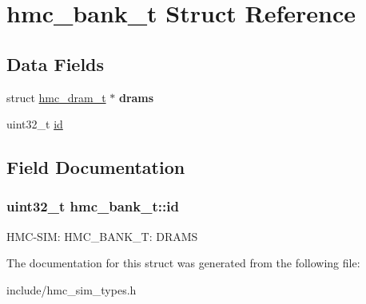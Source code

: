 \hypertarget{structhmc__bank__t}{\section{hmc\-\_\-bank\-\_\-t Struct Reference}
\label{structhmc__bank__t}
}
\subsection*{Data Fields}
\begin{DoxyCompactItemize}
\item 
\hypertarget{structhmc__bank__t_aeced66739084df43f6f14fac91a922d9}{struct \hyperlink{structhmc__dram__t}{hmc\-\_\-dram\-\_\-t} $\ast$ {\bfseries drams}}\label{structhmc__bank__t_aeced66739084df43f6f14fac91a922d9}

\item 
uint32\-\_\-t \hyperlink{structhmc__bank__t_ab169221709752bed51d4711bfc63e452}{id}
\end{DoxyCompactItemize}


\subsection{Field Documentation}
\hypertarget{structhmc__bank__t_ab169221709752bed51d4711bfc63e452}{
\subsubsection[{id}]{\setlength{\rightskip}{0pt plus 5cm}uint32\-\_\-t hmc\-\_\-bank\-\_\-t\-::id}}\label{structhmc__bank__t_ab169221709752bed51d4711bfc63e452}
H\-M\-C-\/\-S\-I\-M\-: H\-M\-C\-\_\-\-B\-A\-N\-K\-\_\-\-T\-: D\-R\-A\-M\-S 

The documentation for this struct was generated from the following file\-:\begin{DoxyCompactItemize}
\item 
include/hmc\-\_\-sim\-\_\-types.\-h\end{DoxyCompactItemize}
